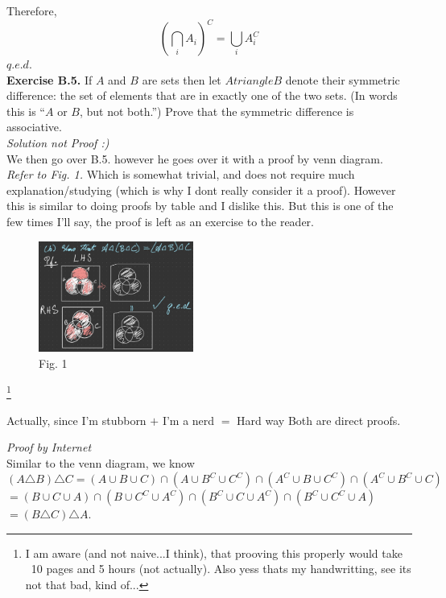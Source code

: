 \documentclass[12pt]{book}
\begin{document}
Therefore, \\
$$\left( \bigcap\limits_i A_i\right)^{C}=\bigcup\limits_i A_i^{C}$$\hfill$q.e.d.$\\


\noindent \textbf{Exercise B.5.} If $A$ and $B$ are sets then let $A triangle B$ denote their symmetric difference: the set of elements that are in exactly one of the two sets. (In words this is “$A$ or $B$, but not both.”) Prove that the symmetric difference is associative.\\

\noindent \textit{Solution not Proof :)} \\
\indent We then go over B.5. however he goes over it with a proof by venn diagram. \textit{Refer to Fig. 1.} Which is somewhat trivial, and does not require much explanation/studying (which is why I dont really consider it a proof). 
However this is similar to doing proofs by table and I dislike this. But this is one of the few times I'll say, the proof is left as an exercise to the reader.\begin{figure}[h]
\begin{center}
\includegraphics[width=2in]{1-20-23 Venn Diagram Proof of B.5.jpg}
\caption*{Fig. 1}
\end{center}
\end{figure}\footnote{I am aware (and not naive...I think), that prooving this properly would take ~10 pages and 5 hours (not actually). Also yess thats my handwritting, see its not that bad, kind of...}

Actually, since I'm stubborn $+$ I'm a nerd $=$ Hard way
Both are direct proofs.

\noindent \textit{Proof by Internet}\\
Similar to the venn diagram, we know\\
$(A \triangle B) \triangle C = (A \cup B \cup C) \cap (A \cup B^{C} \cup C^{C}) \cap (A^{C} \cup B \cup C^{C}) \cap (A^{C} \cup B^{C} \cup C)$\\
$= (B \cup C \cup A) \cap (B \cup C^{C} \cup A^{C}) \cap (B^{C} \cup C \cup A^{C}) \cap (B^{C} \cup C^{C} \cup A)$\\
$=(B \triangle C) \triangle A$.\\
\end{document}
